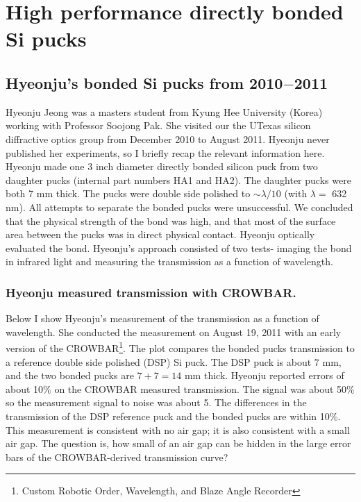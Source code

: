 \chapter{High performance directly bonded Si pucks}

\section{Hyeonju's bonded Si pucks from 2010$-$2011}

Hyeonju Jeong was a masters student from Kyung Hee University (Korea) working with Professor Soojong Pak.  She visited our the UTexas silicon diffractive optics group from December 2010 to August 2011.  Hyeonju never published her experiments, so I briefly recap the relevant information here.  Hyeonju made one 3 inch diameter directly bonded silicon puck from two daughter pucks (internal part numbers HA1 and HA2).  The daughter pucks were both 7 mm thick.  The pucks were double side polished to $\sim \lambda/10$ (with $\lambda=$ 632 nm).  All attempts to separate the bonded pucks were unsuccessful.  We concluded that the physical strength of the bond was high, and that most of the surface area between the pucks was in direct physical contact.  Hyeonju optically evaluated the bond.  Hyeonju's approach consisted of two tests- imaging the bond in infrared light and measuring the transmission as a function of wavelength.  

\subsection{Hyeonju measured transmission with CROWBAR.}
Below I show Hyeonju's measurement of the transmission as a function of wavelength.  She conducted the measurement on August 19, 2011 with an early version of the CROWBAR\footnote{Custom Robotic Order, Wavelength, and Blaze Angle Recorder}.  The plot compares the bonded pucks transmission to a reference double side polished (DSP) Si puck.  The DSP puck is about 7 mm, and the two bonded pucks are $7 + 7 = 14$ mm thick.  Hyeonju reported errors of about 10\% on the CROWBAR measured transmission.  The signal was about 50\% so the measurement signal to noise was about 5.  The differences in the transmission of the DSP reference puck and the bonded pucks are within 10\%.  This measurement is consistent with no air gap; it is also consistent with a small air gap.  The question is, how small of an air gap can be hidden in the large error bars of the CROWBAR-derived transmission curve?

